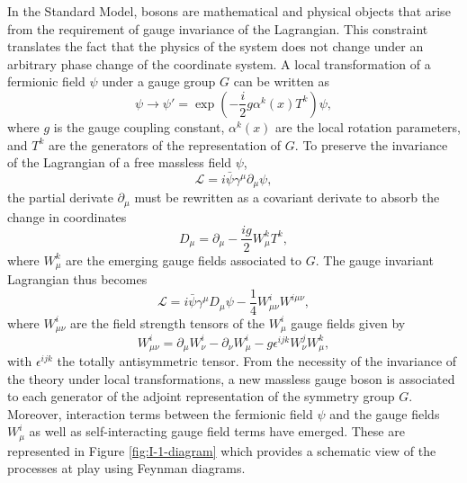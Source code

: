     In the Standard Model, bosons are mathematical and physical objects that arise from the requirement of gauge invariance of the Lagrangian. This constraint translates the fact that the physics of the system does not change under an arbitrary phase change of the coordinate system. A local transformation of a fermionic field $ \psi $ under a gauge group $ G $  can be written as
    \begin{equation}
      \psi \rightarrow \psi' = \exp\left(- \frac{i}{2} g \alpha^k(x) T^k \right) \psi ,
    \end{equation}
    where $ g $ is the gauge coupling constant, $ \alpha^k(x) $ are the local rotation parameters, and $ T^k $ are the generators of the representation of $ G $. To preserve the invariance of the Lagrangian of a free massless field $ \psi $,
    \begin{equation}
      \mathcal{L} = i \bar{\psi} \gamma^\mu \partial_\mu \psi ,
    \end{equation}
    the partial derivate $ \partial_\mu $ must be rewritten as a covariant derivate to absorb the change in coordinates
    \begin{equation}
      D_\mu = \partial_\mu - \frac{i g}{2} W^k_\mu T^k ,
    \end{equation}
    where $ W^k_\mu $ are the emerging gauge fields associated to $ G $. The gauge invariant Lagrangian thus becomes
    \begin{equation}
      \mathcal{L} = i \bar{\psi} \gamma^\mu D_\mu \psi - \frac{1}{4} W^i_{\mu \nu} W^{i \mu \nu} ,
    \end{equation}
    where $ W^i_{\mu \nu} $ are the field strength tensors of the $ W^i_\mu $ gauge fields given by
    \begin{equation}
      W^i_{\mu \nu} = \partial_\mu W^i_\nu - \partial_\nu W^i_\mu - g \epsilon^{ijk} W^j_\nu W^k_\mu ,
    \end{equation}
    with $ \epsilon^{ijk} $ the totally antisymmetric tensor. From the necessity of the invariance of the theory under local transformations, a new massless gauge boson is associated to each generator of the adjoint representation of the symmetry group $ G $. Moreover, interaction terms between the fermionic field $ \psi $ and the gauge fields $ W^i_\mu $ as well as self-interacting gauge field terms have emerged. These are represented in Figure \ref{fig:I-1-diagram} which provides a schematic view of the processes at play using Feynman diagrams.

